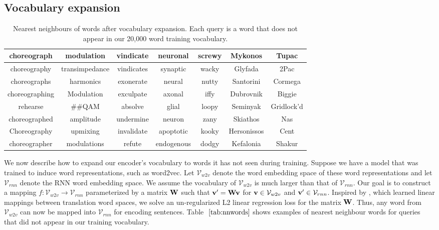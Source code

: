 \documentclass{article} \usepackage{nips15submit_e,times}
\begin{document}
\subsection{Vocabulary expansion}


\begin{table}
\small
\centering
\begin{tabular}{c|c|c|c|c|c|c}
\toprule \bf choreograph & \bf modulation & \bf vindicate & \bf neuronal & \bf screwy & \bf Mykonos & \bf Tupac \\ \midrule
choreography & transimpedance & vindicates & synaptic & wacky & Glyfada & 2Pac \\
choreographs & harmonics &  exonerate & neural & nutty & Santorini & Cormega \\
choreographing & Modulation &  exculpate & axonal & iffy & Dubrovnik & Biggie \\
rehearse &  \#\#QAM & absolve &  glial & loopy & Seminyak & Gridlock'd \\
choreographed & amplitude & undermine & neuron & zany & Skiathos & Nas \\
Choreography & upmixing & invalidate &  apoptotic & kooky & Hersonissos & Cent \\
choreographer & modulations &  refute &  endogenous & dodgy & Kefalonia & Shakur \\ \bottomrule

\end{tabular}
\caption{Nearest neighbours of words after vocabulary expansion. Each query is a word that does not appear in our 20,000 word training vocabulary. }
\label{tab:nnwords}
\end{table}


We now describe how to expand our encoder's vocabulary to words it has not seen during training. Suppose we have a model that was trained to induce word representations, such as word2vec. Let $\mathcal{V}_{w2v}$ denote the word embedding space of these word representations and let $\mathcal{V}_{rnn}$ denote the RNN word embedding space. We assume the vocabulary of $\mathcal{V}_{w2v}$ is much larger than that of $\mathcal{V}_{rnn}$. Our goal is to construct a mapping $f : \mathcal{V}_{w2v} \rightarrow \mathcal{V}_{rnn}$ parameterized by a matrix ${\bf W}$ such that ${\bf v}' = {\bf W} {\bf v}$ for ${\bf v} \in \mathcal{V}_{w2v}$ and ${\bf v'} \in \mathcal{V}_{rnn}$. Inspired by \cite{mikolov2013exploiting}, which learned linear mappings between translation word spaces, we solve an un-regularized L2 linear regression loss for the matrix ${\bf W}$. Thus, any word from $\mathcal{V}_{w2v}$ can now be mapped into $\mathcal{V}_{rnn}$ for encoding sentences. Table $~\ref{tab:nnwords}$ shows examples of nearest neighbour words for queries that did not appear in our training vocabulary.
\end{document}
